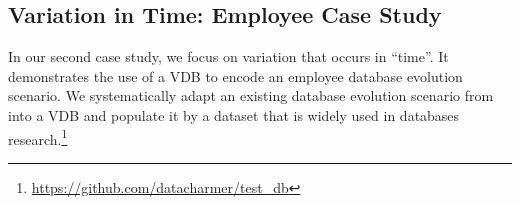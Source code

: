 \subsection{Variation in Time: Employee Case Study}
\label{app:emp-vdb}



%
%

In our second case study, we focus on variation that occurs in ``time''.
It demonstrates the use of a VDB to encode an employee database evolution
scenario. We systematically adapt an existing database evolution scenario from
\citet{prima08Moon} into a VDB and populate it by a dataset that is widely used
in databases research.\footnote{\url{https://github.com/datacharmer/test_db}}


